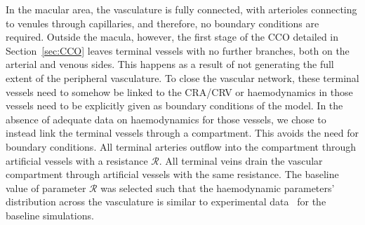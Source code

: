 \documentclass[11pt,]{article}
\begin{document}
In the macular area, the vasculature is fully connected, with
arterioles connecting to venules through capillaries, and therefore, no boundary conditions are required.
Outside the macula, however, the first stage of the CCO detailed in
Section~\ref{sec:CCO} leaves terminal vessels with no further branches, both on the arterial and venous sides.
This happens as a result of not generating the full extent of the peripheral vasculature.
To close the vascular network, these terminal vessels need to somehow be linked to the CRA/CRV or haemodynamics in those vessels need to be explicitly given as boundary conditions of the model.
In the absence of adequate data on haemodynamics for those vessels, we chose to instead link the terminal vessels through a compartment.
This avoids the need for boundary conditions.
All terminal arteries outflow into the compartment through artificial vessels with a resistance $\mathcal R$.
All terminal veins drain the vascular compartment through artificial vessels with the same resistance. 
The baseline value of parameter $\mathcal R$ was selected such that the haemodynamic parameters' distribution across the vasculature is similar to experimental data~\cite{DoblhoffDier2014,Riva1985} for the baseline simulations.
\end{document}
